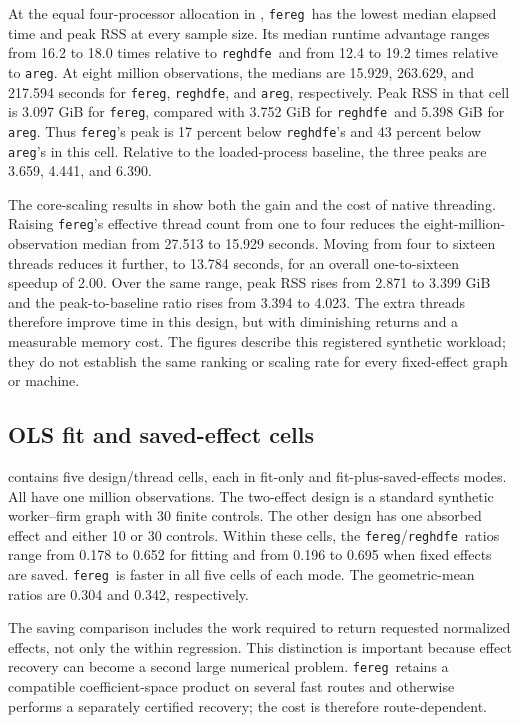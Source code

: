 \documentclass[11pt]{article}
\newcommand{\fereg}{\texttt{fereg}}
\newcommand{\reghdfe}{\texttt{reghdfe}}
\newcommand{\areg}{\texttt{areg}}
\begin{document}
At the equal four-processor allocation in , \fereg\
has the lowest median elapsed time and peak RSS at every sample size.  Its
median runtime advantage ranges from 16.2 to 18.0 times relative to
\reghdfe\ and from 12.4 to 19.2 times relative to \areg.  At eight million
observations, the medians are 15.929, 263.629, and 217.594 seconds for
\fereg, \reghdfe, and \areg, respectively.  Peak RSS in that cell is 3.097
GiB for \fereg, compared with 3.752 GiB for \reghdfe\ and 5.398 GiB for
\areg.  Thus \fereg's peak is 17 percent below \reghdfe's and 43 percent
below \areg's in this cell.  Relative to the loaded-process baseline, the
three peaks are 3.659, 4.441, and 6.390.

The core-scaling results in  show both the gain and
the cost of native threading.  Raising \fereg's effective thread count from
one to four reduces the eight-million-observation median from 27.513 to
15.929 seconds.  Moving from four to sixteen threads reduces it further, to
13.784 seconds, for an overall one-to-sixteen speedup of 2.00.  Over the same
range, peak RSS rises from 2.871 to 3.399 GiB and the peak-to-baseline ratio
rises from 3.394 to 4.023.  The extra threads therefore improve time in this
design, but with diminishing returns and a measurable memory cost.  The
figures describe this registered synthetic workload; they do not establish
the same ranking or scaling rate for every fixed-effect graph or machine.

\subsection{OLS fit and saved-effect cells}



 contains five design/thread cells, each in fit-only and
fit-plus-saved-effects modes.  All have one million observations.  The
two-effect design is a standard synthetic worker--firm graph with 30 finite
controls.  The other design has one absorbed effect and either 10 or 30
controls.  Within these cells, the \fereg/\reghdfe\ ratios range from 0.178 to
0.652 for fitting and from 0.196 to 0.695 when fixed effects are saved.
\fereg\ is faster in all five cells of each mode.  The geometric-mean ratios
are 0.304 and 0.342, respectively.

The saving comparison includes the work required to return requested
normalized effects, not only the within regression.  This distinction is
important because effect recovery can become a second large numerical
problem.  \fereg\ retains a compatible coefficient-space product on several
fast routes and otherwise performs a separately certified recovery; the cost
is therefore route-dependent.
\end{document}
